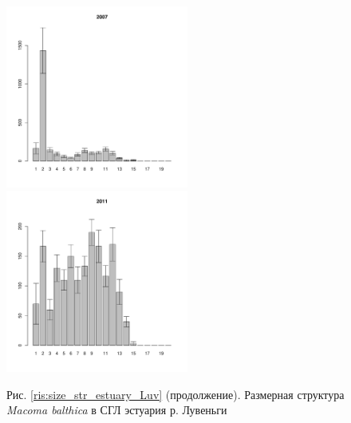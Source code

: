\begin{figure}[h]

\begin{multicols}{3}
\hfill
\includegraphics[width=60mm]{../White_Sea/Estuatiy_Luvenga/sizestr_2007_.pdf}
\hfill
\includegraphics[width=60mm]{../White_Sea/Estuatiy_Luvenga/sizestr_2011_.pdf}
\end{multicols}


\begin{center}
Рис. \ref{ris:size_str_estuary_Luv} (продолжение). Размерная структура {\it Macoma balthica} в СГЛ эстуария р. Лувеньги

\end{center}
\end{figure}

